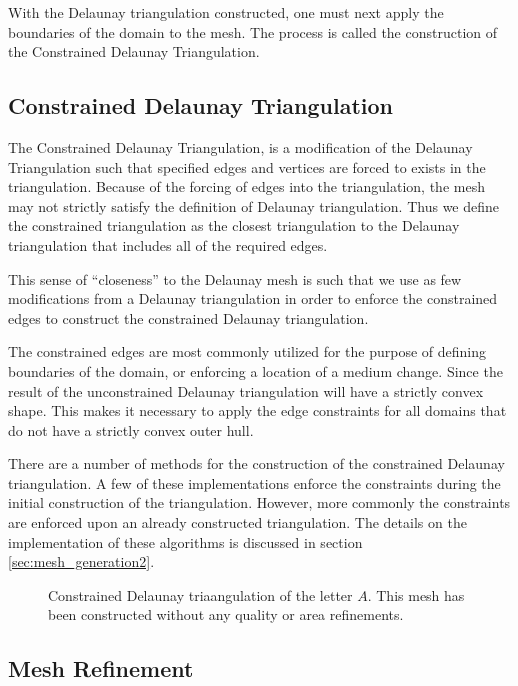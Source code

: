 \documentclass[../fem.tex]{subfile}
\begin{document}
With the Delaunay triangulation constructed, one must next apply the boundaries
of the domain to the mesh. The process is called the construction of the
Constrained Delaunay Triangulation.

\subsection{Constrained Delaunay Triangulation}%
\label{sub:constrained_delaunay_triangulation}

The Constrained Delaunay Triangulation, is a modification of the Delaunay
Triangulation such that specified edges and vertices are forced to exists in
the triangulation. Because of the forcing of edges into the triangulation, the
mesh may not strictly satisfy the definition of Delaunay triangulation. Thus we
define the constrained triangulation as the closest triangulation to the
Delaunay triangulation that includes all of the required edges.

This sense of ``closeness'' to the Delaunay mesh is such that we use as few
modifications from a Delaunay triangulation in order to enforce the constrained
edges to construct the constrained Delaunay triangulation.

The constrained edges are most commonly utilized for the purpose of defining
boundaries of the domain, or enforcing a location of a medium change. Since the
result of the unconstrained Delaunay triangulation will have a strictly convex
shape. This makes it necessary to apply the edge constraints for all domains
that do not have a strictly convex outer hull.

There are a number of methods for the construction of the constrained Delaunay
triangulation. A few of these implementations enforce the constraints during
the initial construction of the triangulation. However, more commonly the
constraints are enforced upon an already constructed triangulation. The details
on the implementation of these algorithms is discussed in section
\ref{sec:mesh_generation2}.

\begin{figure}[htpb]
  \centering
  
  \caption{Constrained Delaunay triaangulation of the letter $A$. This mesh has
  been constructed without any quality or area refinements.}
  \label{fig:delaunay_constrained}
\end{figure}

\subsection{Mesh Refinement}%
\label{sub:mesh_refinement}
\end{document}
